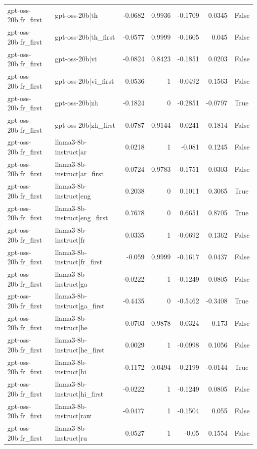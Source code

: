 \begin{table}
\begin{tabular}{l l r r r r l}
gpt-oss-20b|fr_first & gpt-oss-20b|th & -0.0682 & 0.9936 & -0.1709 & 0.0345 & False \\
gpt-oss-20b|fr_first & gpt-oss-20b|th_first & -0.0577 & 0.9999 & -0.1605 & 0.045 & False \\
gpt-oss-20b|fr_first & gpt-oss-20b|vi & -0.0824 & 0.8423 & -0.1851 & 0.0203 & False \\
gpt-oss-20b|fr_first & gpt-oss-20b|vi_first & 0.0536 & 1 & -0.0492 & 0.1563 & False \\
gpt-oss-20b|fr_first & gpt-oss-20b|zh & -0.1824 & 0 & -0.2851 & -0.0797 & True \\
gpt-oss-20b|fr_first & gpt-oss-20b|zh_first & 0.0787 & 0.9144 & -0.0241 & 0.1814 & False \\
gpt-oss-20b|fr_first & llama3-8b-instruct|ar & 0.0218 & 1 & -0.081 & 0.1245 & False \\
gpt-oss-20b|fr_first & llama3-8b-instruct|ar_first & -0.0724 & 0.9783 & -0.1751 & 0.0303 & False \\
gpt-oss-20b|fr_first & llama3-8b-instruct|eng & 0.2038 & 0 & 0.1011 & 0.3065 & True \\
gpt-oss-20b|fr_first & llama3-8b-instruct|eng_first & 0.7678 & 0 & 0.6651 & 0.8705 & True \\
gpt-oss-20b|fr_first & llama3-8b-instruct|fr & 0.0335 & 1 & -0.0692 & 0.1362 & False \\
gpt-oss-20b|fr_first & llama3-8b-instruct|fr_first & -0.059 & 0.9999 & -0.1617 & 0.0437 & False \\
gpt-oss-20b|fr_first & llama3-8b-instruct|ga & -0.0222 & 1 & -0.1249 & 0.0805 & False \\
gpt-oss-20b|fr_first & llama3-8b-instruct|ga_first & -0.4435 & 0 & -0.5462 & -0.3408 & True \\
gpt-oss-20b|fr_first & llama3-8b-instruct|he & 0.0703 & 0.9878 & -0.0324 & 0.173 & False \\
gpt-oss-20b|fr_first & llama3-8b-instruct|he_first & 0.0029 & 1 & -0.0998 & 0.1056 & False \\
gpt-oss-20b|fr_first & llama3-8b-instruct|hi & -0.1172 & 0.0494 & -0.2199 & -0.0144 & True \\
gpt-oss-20b|fr_first & llama3-8b-instruct|hi_first & -0.0222 & 1 & -0.1249 & 0.0805 & False \\
gpt-oss-20b|fr_first & llama3-8b-instruct|raw & -0.0477 & 1 & -0.1504 & 0.055 & False \\
gpt-oss-20b|fr_first & llama3-8b-instruct|ru & 0.0527 & 1 & -0.05 & 0.1554 & False \\

\end{tabular}
\end{table}
